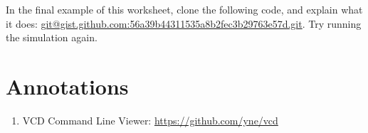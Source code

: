 \documentclass{dcbl/challenge}
\begin{document}
\begin{aufgabe}
    In the final example of this worksheet, clone the following code, and explain what it does: \url{git@gist.github.com:56a39b44311535a8b2fec3b29763e57d.git}.
    Try running the simulation again.
\end{aufgabe}

\section*{Annotations}
\begin{enumerate}
    \item VCD Command Line Viewer: \url{https://github.com/yne/vcd}
\end{enumerate}
\end{document}
